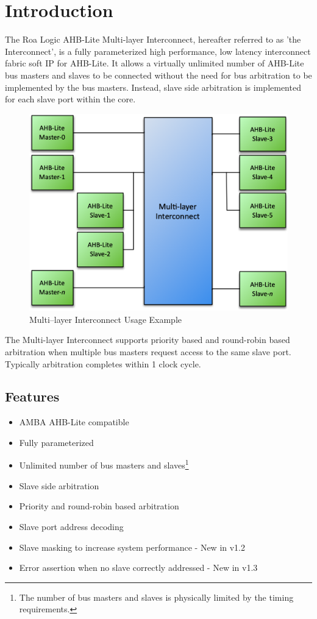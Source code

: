 \chapter{Introduction}\label{introduction}

The Roa Logic AHB-Lite Multi-layer Interconnect, hereafter referred to as 'the Interconnect', is a fully parameterized high performance, low latency interconnect fabric soft IP for AHB-Lite.
It allows a virtually unlimited number of AHB-Lite bus masters and
slaves to be connected without the need for bus arbitration to be
implemented by the bus masters. Instead, slave side arbitration is
implemented for each slave port within the core.

\begin{figure}[tbh]
  \centering
  \includegraphics[scale=0.9]{assets/img/ahb-lite-switch-sys}
  \caption{Multi--layer Interconnect Usage Example}
  \label{fig:ahb-lite-switch-sys}
\end{figure}


The Multi-layer Interconnect supports priority based and round-robin based
arbitration when multiple bus masters request access to the same slave
port. Typically arbitration completes within 1 clock cycle.

\section{Features}\label{features}

\begin{itemize}
\item
  AMBA AHB-Lite compatible
\item
  Fully parameterized
\item
  Unlimited number of bus masters and slaves\footnote{The number of bus
    masters and slaves is physically limited by the timing requirements.}
\item
  Slave side arbitration
\item
  Priority and round-robin based arbitration
\item
  Slave port address decoding
\item
  Slave masking to increase system performance - New in v1.2
\item
  Error assertion when no slave correctly addressed - New in v1.3
\end{itemize}
